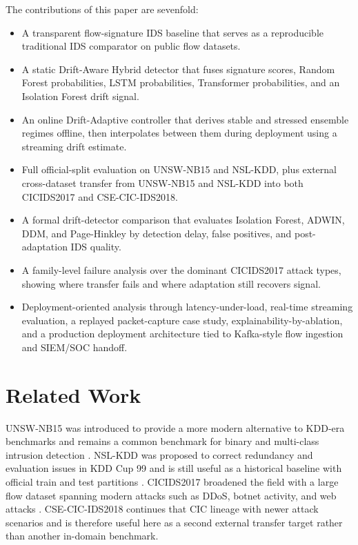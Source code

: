 \documentclass[conference]{IEEEtran}
\begin{document}
The contributions of this paper are sevenfold:
\begin{itemize}
\item A transparent flow-signature IDS baseline that serves as a reproducible traditional IDS comparator on public flow datasets.
\item A static Drift-Aware Hybrid detector that fuses signature scores, Random Forest probabilities, LSTM probabilities, Transformer probabilities, and an Isolation Forest drift signal.
\item An online Drift-Adaptive controller that derives stable and stressed ensemble regimes offline, then interpolates between them during deployment using a streaming drift estimate.
\item Full official-split evaluation on UNSW-NB15 and NSL-KDD, plus external cross-dataset transfer from UNSW-NB15 and NSL-KDD into both CICIDS2017 and CSE-CIC-IDS2018.
\item A formal drift-detector comparison that evaluates Isolation Forest, ADWIN, DDM, and Page-Hinkley by detection delay, false positives, and post-adaptation IDS quality.
\item A family-level failure analysis over the dominant CICIDS2017 attack types, showing where transfer fails and where adaptation still recovers signal.
\item Deployment-oriented analysis through latency-under-load, real-time streaming evaluation, a replayed packet-capture case study, explainability-by-ablation, and a production deployment architecture tied to Kafka-style flow ingestion and SIEM/SOC handoff.
\end{itemize}

\section{Related Work}
UNSW-NB15 was introduced to provide a more modern alternative to KDD-era benchmarks and remains a common benchmark for binary and multi-class intrusion detection \cite{moustafa2015unsw}. NSL-KDD was proposed to correct redundancy and evaluation issues in KDD Cup 99 and is still useful as a historical baseline with official train and test partitions \cite{tavallaee2009kdd}. CICIDS2017 broadened the field with a large flow dataset spanning modern attacks such as DDoS, botnet activity, and web attacks \cite{sharafaldin2018cicids}. CSE-CIC-IDS2018 continues that CIC lineage with newer attack scenarios and is therefore useful here as a second external transfer target rather than another in-domain benchmark.
\end{document}
